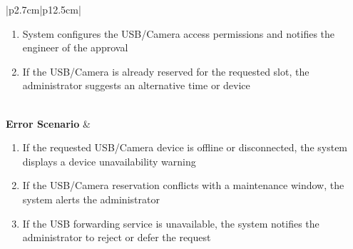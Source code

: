 \begin{table}[H]
\begin{tabular}{|p{2.7cm}|p{12.5cm}|}
\begin{minipage}[t]{\linewidth}
\begin{enumerate}[topsep=0pt,itemsep=1pt,parsep=0pt,partopsep=0pt]
                                                the specified time slot
                                          \item System configures the USB/Camera access permissions and notifies the engineer
                                                of the approval
                                          \item If the USB/Camera is already reserved for the requested slot, the administrator
                                                suggests an alternative time or device
                                      \end{enumerate}
                                  \end{minipage}                                                                                \\ \hline
        \textbf{Error Scenario} & \begin{minipage}[t]{\linewidth}
                                      \begin{enumerate}[topsep=0pt,itemsep=1pt,parsep=0pt,partopsep=0pt]
                                          \item If the requested USB/Camera device is offline or disconnected, the system
                                                displays a device unavailability warning
                                          \item If the USB/Camera reservation conflicts with a maintenance window, the system
                                                alerts the administrator
                                          \item If the USB forwarding service is unavailable, the system notifies the
                                                administrator to reject or defer the request
                                      \end{enumerate}
                                  \end{minipage}                                                                                  \\ \hline
    \end{tabular}
    \label{tab:admin-USB/Camera-reservations}
\end{table}

